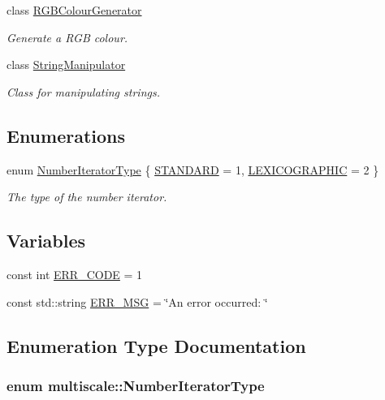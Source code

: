 \begin{DoxyCompactItemize}
class \hyperlink{classmultiscale_1_1RGBColourGenerator}{R\-G\-B\-Colour\-Generator}
\begin{DoxyCompactList}\small\item\em Generate a R\-G\-B colour. \end{DoxyCompactList}\item 
class \hyperlink{classmultiscale_1_1StringManipulator}{String\-Manipulator}
\begin{DoxyCompactList}\small\item\em Class for manipulating strings. \end{DoxyCompactList}\end{DoxyCompactItemize}
\subsection*{Enumerations}
\begin{DoxyCompactItemize}
\item 
enum \hyperlink{namespacemultiscale_a6ef911f4d48a4bf5e657c237ec169ff5}{Number\-Iterator\-Type} \{ \hyperlink{namespacemultiscale_a6ef911f4d48a4bf5e657c237ec169ff5aa048887eb0360a4b70dff5452133f42e}{S\-T\-A\-N\-D\-A\-R\-D} = 1, 
\hyperlink{namespacemultiscale_a6ef911f4d48a4bf5e657c237ec169ff5a2cba3a0174cc5c1d555ee13dcf6cda15}{L\-E\-X\-I\-C\-O\-G\-R\-A\-P\-H\-I\-C} = 2
 \}
\begin{DoxyCompactList}\small\item\em The type of the number iterator. \end{DoxyCompactList}\end{DoxyCompactItemize}
\subsection*{Variables}
\begin{DoxyCompactItemize}
\item 
const int \hyperlink{namespacemultiscale_a4ee40795105048ee371efeeb7962ecf6}{E\-R\-R\-\_\-\-C\-O\-D\-E} = 1
\item 
const std\-::string \hyperlink{namespacemultiscale_a06490e4e11ef359aa0260f96579ce584}{E\-R\-R\-\_\-\-M\-S\-G} = \char`\"{}An error occurred\-: \char`\"{}
\end{DoxyCompactItemize}


\subsection{Enumeration Type Documentation}
\hypertarget{namespacemultiscale_a6ef911f4d48a4bf5e657c237ec169ff5}{
\subsubsection[{Number\-Iterator\-Type}]{\setlength{\rightskip}{0pt plus 5cm}enum {\bf multiscale\-::\-Number\-Iterator\-Type}}}\label{namespacemultiscale_a6ef911f4d48a4bf5e657c237ec169ff5}


